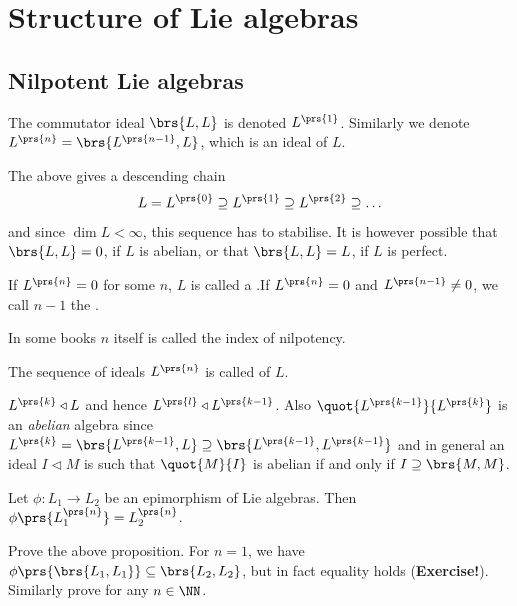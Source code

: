 \documentclass[10pt,a4paper,twoside,openany,hidelinks]{book}
\begin{document}
\chapter{Structure of Lie algebras}
\section{Nilpotent Lie algebras}
\begin{definition}
The commutator ideal $\brs{L,L}$ is denoted $L^{\prs{1}}$.
Similarly we denote $L^{\prs{n}} = \brs{L^{\prs{n-1}},L}$, which is an ideal of $L$.
\end{definition}
\begin{remark}
The above gives a descending chain
\[L = L^{\prs{0}} \supseteq L^{\prs{1}} \supseteq L^{\prs{2}} \supseteq \ldots\]
and since $\dim L < \infty$, this sequence has to stabilise.
It is however possible that $\brs{L,L}=0$, if $L$ is abelian, or that $\brs{L,L} = L$, if $L$ is perfect.
\end{remark}
\begin{definition}
If $L^{\prs{n}} = 0$ for some $n$, $L$ is called a 
.If $L^{\prs{n}} = 0$ and $L^{\prs{n-1}} \neq 0$, we call $n-1$ the .
\end{definition}
\begin{note}
In some books $n$ itself is called the index of nilpotency.
\end{note}
\begin{definition}
The sequence of ideals $L^{\prs{n}}$ is called  of $L$.
\end{definition}
\begin{remark}
$L^{\prs{k}} \triangleleft L$ and hence $L^{\prs{l}} \triangleleft L^{\prs{k-1}}$. Also $\quot{L^{\prs{k-1}}}{L^{\prs{k}}}$ is an \emph{abelian} algebra
since $L^{\prs{k}} = \brs{L^{\prs{k-1}}, L} \supseteq \brs{L^{\prs{k-1}}, L^{\prs{k-1}}}$ and in general an ideal $I \triangleleft M$ is such that $\quot{M}{I}$ is abelian if and only if $I \supseteq \brs{M,M}$.
\end{remark}
\begin{proposition}
Let $\phi \colon L_1 \to L_2$ be an epimorphism of Lie algebras. Then $\phi\prs{L_1^{\prs{n}}} = L_2^{\prs{n}}$.
\end{proposition}
\begin{exercise}
Prove the above proposition.
For $n=1$, we have $\phi\prs{\brs{L_1,L_1}} \subseteq \brs{L_2, L_2}$, but in fact equality holds (\textbf{Exercise!}).
Similarly prove for any $n \in \NN$.
\end{exercise}
\end{document}
